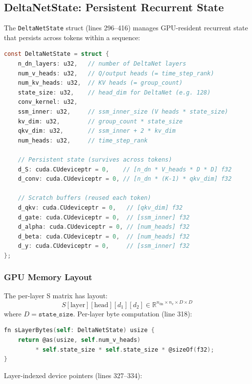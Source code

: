 \documentclass[11pt]{article}
\begin{document}
\subsection{DeltaNetState: Persistent Recurrent State}

The \texttt{DeltaNetState} struct (lines 296--416) manages GPU-resident recurrent
state that persists across tokens within a sequence:

\begin{lstlisting}[language=C,caption={DeltaNetState layout (cuda\_forward.zig:296--316)}]
const DeltaNetState = struct {
    n_dn_layers: u32,   // number of DeltaNet layers
    num_v_heads: u32,   // Q/output heads (= time_step_rank)
    num_kv_heads: u32,  // KV heads (= group_count)
    state_size: u32,    // head_dim for DeltaNet (e.g. 128)
    conv_kernel: u32,
    ssm_inner: u32,     // ssm_inner_size (V heads * state_size)
    kv_dim: u32,        // group_count * state_size
    qkv_dim: u32,       // ssm_inner + 2 * kv_dim
    num_heads: u32,     // time_step_rank

    // Persistent state (survives across tokens)
    d_S: cuda.CUdeviceptr = 0,    // [n_dn * V_heads * D * D] f32
    d_conv: cuda.CUdeviceptr = 0, // [n_dn * (K-1) * qkv_dim] f32

    // Scratch buffers (reused each token)
    d_qkv: cuda.CUdeviceptr = 0,   // [qkv_dim] f32
    d_gate: cuda.CUdeviceptr = 0,  // [ssm_inner] f32
    d_alpha: cuda.CUdeviceptr = 0, // [num_heads] f32
    d_beta: cuda.CUdeviceptr = 0,  // [num_heads] f32
    d_y: cuda.CUdeviceptr = 0,     // [ssm_inner] f32
};
\end{lstlisting}

\subsubsection{GPU Memory Layout}

The per-layer S matrix has layout:
\[
S[\text{layer}][\text{head}][d_1][d_2] \in \mathbb{R}^{n_{\text{dn}} \times n_v \times D \times D}
\]
where $D = \texttt{state\_size}$. Per-layer byte computation (line 318):

\begin{lstlisting}[language=C,caption={Per-layer S matrix bytes (cuda\_forward.zig:318--320)}]
fn sLayerBytes(self: DeltaNetState) usize {
    return @as(usize, self.num_v_heads)
         * self.state_size * self.state_size * @sizeOf(f32);
}
\end{lstlisting}

Layer-indexed device pointers (lines 327--334):
\end{document}
